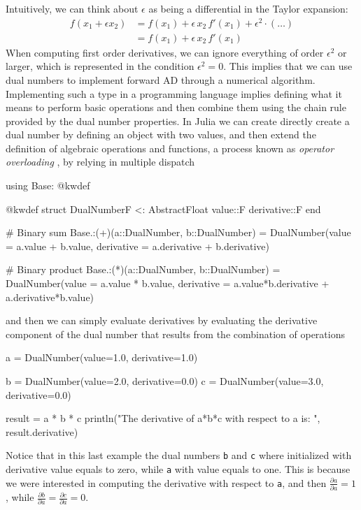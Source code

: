 Intuitively, we can think about $\epsilon$ as being a differential in the Taylor expansion:
\begin{align}
    f(x_1 + \epsilon x_2)
    &= 
    f(x_1)
    + 
    \epsilon \, x_2 \,  f'(x_1)
    + 
    \epsilon^2 \cdot ( \ldots ) \nonumber \\
    &= 
    f(x_1)
    + 
    \epsilon \, x_2 \,  f'(x_1)
    \label{eq:dual-number-function}
\end{align}
When computing first order derivatives, we can ignore everything of order $\epsilon^2$ or larger, which is represented in the condition $\epsilon^2 = 0$.
This implies that we can use dual numbers to implement forward AD through a numerical algorithm. 
Implementing such a type in a programming language implies defining what it means to perform basic operations and then combine them using the chain rule provided by the dual number properties.
In Julia we can create directly create a dual number by defining an object with two values, and then extend the definition of algebraic operations and functions, a process known as \textit{operator overloading} \cite{Neuenhofen_2018}, by relying in multiple dispatch
\begin{jllisting}
using Base: @kwdef

@kwdef struct DualNumber{F <: AbstractFloat}
    value::F
    derivative::F
end

# Binary sum
Base.:(+)(a::DualNumber, b::DualNumber) = DualNumber(value = a.value + b.value, derivative = a.derivative + b.derivative)

# Binary product 
Base.:(*)(a::DualNumber, b::DualNumber) = DualNumber(value = a.value * b.value, derivative = a.value*b.derivative + a.derivative*b.value)
\end{jllisting}
and then we can simply evaluate derivatives by evaluating the derivative component of the dual number that results from the combination of operations
\begin{jllisting}
a = DualNumber(value=1.0, derivative=1.0)

b = DualNumber(value=2.0, derivative=0.0)
c = DualNumber(value=3.0, derivative=0.0)

result = a * b * c
println("The derivative of a*b*c with respect to a is: ", result.derivative)
\end{jllisting}
Notice that in this last example the dual numbers \texttt{b} and \texttt{c} where initialized with derivative value equals to zero, while \texttt{a} with value equals to one. 
This is because we were interested in computing the derivative with respect to \texttt{a}, and then $\frac{\partial a}{\partial a} = 1$, while $\frac{\partial b}{\partial a} = \frac{\partial c}{\partial a} = 0$. 

